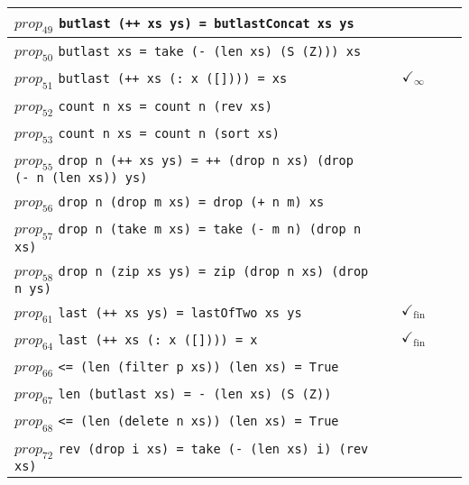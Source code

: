 \documentclass{article}
\begin{document}
\begin{longtable}{p{10cm} || c | c | c | c | }
\hline
$prop_{49}$ \newline \verb`butlast (++ xs ys) = butlastConcat xs ys` &  &  &  &  \\
\hline
$prop_{50}$ \newline \verb`butlast xs = take (- (len xs) (S (Z))) xs` &  &  &  &  \\
\hline
$prop_{51}$ \newline \verb`butlast (++ xs (: x ([]))) = xs` &  & $\checkmark_{\infty}$ &  &  \\
\hline
$prop_{52}$ \newline \verb`count n xs = count n (rev xs)` &  &  &  &  \\
\hline
$prop_{53}$ \newline \verb`count n xs = count n (sort xs)` &  &  &  &  \\
\hline
$prop_{55}$ \newline \verb`drop n (++ xs ys) = ++ (drop n xs) (drop (- n (len xs)) ys)` &  &  &  &  \\
\hline
$prop_{56}$ \newline \verb`drop n (drop m xs) = drop (+ n m) xs` &  &  &  &  \\
\hline
$prop_{57}$ \newline \verb`drop n (take m xs) = take (- m n) (drop n xs)` &  &  &  &  \\
\hline
$prop_{58}$ \newline \verb`drop n (zip xs ys) = zip (drop n xs) (drop n ys)` &  &  &  &  \\
\hline
$prop_{61}$ \newline \verb`last (++ xs ys) = lastOfTwo xs ys` &  & $\checkmark_{\mathrm{fin}}$ &  &  \\
\hline
$prop_{64}$ \newline \verb`last (++ xs (: x ([]))) = x` &  & $\checkmark_{\mathrm{fin}}$ &  &  \\
\hline
$prop_{66}$ \newline \verb`<= (len (filter p xs)) (len xs) = True` &  &  &  &  \\
\hline
$prop_{67}$ \newline \verb`len (butlast xs) = - (len xs) (S (Z))` &  &  &  &  \\
\hline
$prop_{68}$ \newline \verb`<= (len (delete n xs)) (len xs) = True` &  &  &  &  \\
\hline
$prop_{72}$ \newline \verb`rev (drop i xs) = take (- (len xs) i) (rev xs)` &  &  &  &  \\

\end{longtable}
\end{document}
